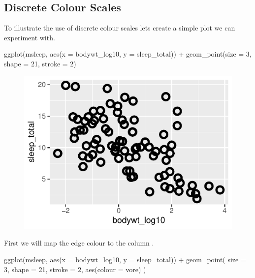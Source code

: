 \vspace{1em}

\subsection{Discrete Colour Scales}
\label{sec:discrete_cols}

To illustrate the use of discrete colour scales lets create a simple plot we can experiment with.

\begin{inR}
ggplot(msleep, aes(x = bodywt_log10, y = sleep_total)) +
  geom_point(size = 3, shape = 21, stroke = 2)
\end{inR}

\vspace{2em}

\begin{figure}[H]
\includegraphics[scale = .75]{graphics/ch2Figs/ggEx_20.pdf}
\end{figure}

\noindent
First we will map the edge colour to the column .

\begin{inR}
ggplot(msleep, aes(x = bodywt_log10, y = sleep_total)) +
  geom_point(
    size = 3, shape = 21, stroke = 2,
    aes(colour = vore)
  )
\end{inR}

\vspace{2em}

